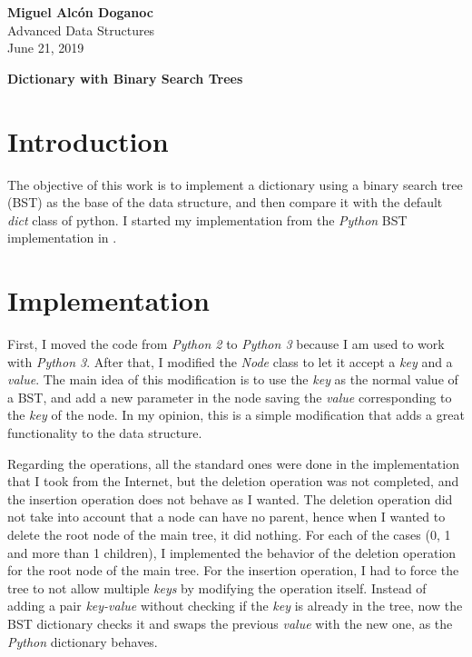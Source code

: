 \documentclass[a4paper, 10pt]{article}
\begin{document}
\noindent
\begin{flushright}
    \large\textbf{Miguel Alcón Doganoc} \\
    Advanced Data Structures \\
	June 21, 2019
\end{flushright}

\noindent
{\huge{\textbf{Dictionary with Binary Search Trees}}}

\section*{Introduction}
The objective of this work is to implement a dictionary using a binary search tree (BST) as the base of the data structure, and then compare it with the default \textit{dict} class of python. I started my implementation from the \textit{Python} BST implementation in \cite{python}.

\section*{Implementation}
First, I moved the code from \textit{Python 2} to \textit{Python 3} because I am used to work with \textit{Python 3}. After that, I modified the \textit{Node} class to let it accept a \textit{key} and a \textit{value}. The main idea of this modification is to use the \textit{key} as the normal value of a BST, and add a new parameter in the node saving the \textit{value} corresponding to the \textit{key} of the node. In my opinion, this is a simple modification that adds a great functionality to the data structure.

Regarding the operations, all the standard ones were done in the implementation that I took from the Internet, but the deletion operation was not completed, and the insertion operation does not behave as I wanted. The deletion operation did not take into account that a node can have no parent, hence when I wanted to delete the root node of the main tree, it did nothing. For each of the cases (0, 1 and more than 1 children), I implemented the behavior of the deletion operation for the root node of the main tree. For the insertion operation, I had to force the tree to not allow multiple \textit{keys} by modifying the operation itself. Instead of adding a pair \textit{key-value} without checking if the \textit{key} is already in the tree, now the BST dictionary checks it and swaps the previous \textit{value} with the new one, as the \textit{Python} dictionary behaves.
\end{document}

